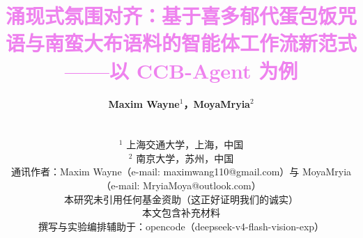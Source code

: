 \documentclass[journal]{IEEEtran}
\begin{document}
\title{\vspace*{0.5cm}\textcolor{violet}{涌现式氛围对齐：基于喜多郁代蛋包饭咒语与南蛮大布语料的智能体工作流新范式——以 CCB-Agent 为例}
\vspace*{0.5cm}
}

\author{\textbf{Maxim Wayne$^{1}$，MoyaMryia$^{2}$}\\
	\vspace*{0.1cm}

	　　\\
	\vspace*{0.2cm}
	\small
	$^{1}$ 上海交通大学，上海，中国 \\
	$^{2}$ 南京大学，苏州，中国 \\
	\vspace*{0.1cm}
	通讯作者：Maxim Wayne（e-mail: maximwang110@gmail.com）与 MoyaMryia（e-mail: MryiaMoya@outlook.com）\\
	\vspace*{0.1cm}
	本研究未引用任何基金资助（这正好证明我们的诚实）\\
	本文包含补充材料\\
	撰写与实验编排辅助于：opencode（deepseek-v4-flash-vision-exp）
	\normalsize
}
\end{document}

